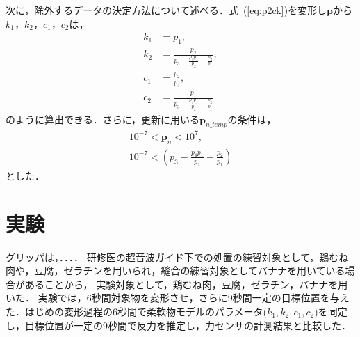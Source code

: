 \documentclass[a4paper]{jarticle}
\begin{document}
次に，除外するデータの決定方法について述べる．式~(\ref{eq:p2ck})を変形し$\mathbf{p}$から$k_1$，$k_2$，$c_1$，$c_2$は，
\begin{equation}
    \begin{aligned}
        k_1 &= p_1 ,\\
        k_2 &= \frac{p_2}{p_3 - \frac{p_4 p_1}{p_2} - \frac{p_2}{p_1}} ,\\
        c_1 &= \frac{p_2}{p_4},\\
        c_2 &= \frac{p_1}{p_3 - \frac{p_4 p_1}{p_2} - \frac{p_2}{p_1}} 
    \end{aligned}
\end{equation}
のように算出できる．さらに，更新に用いる$\mathbf{p}_{n\_temp}$の条件は，
\begin{equation}
    \begin{aligned}
        10^{-7} < \mathbf{p}_{n} < 10^{7} ,\\
        10^{-7} < \left( p_3 - \frac{p_4 p_1}{p_2} - \frac{p_2}{p_1} \right)
    \end{aligned}
\end{equation}
とした．

\section{実験}
グリッパは，．．．．
研修医の超音波ガイド下での処置の練習対象として，鶏むね肉や，豆腐，ゼラチンを用いられ，縫合の練習対象としてバナナを用いている場合があることから，
実験対象として，鶏むね肉，豆腐，ゼラチン，バナナを用いた．
実験では，6秒間対象物を変形させ，さらに9秒間一定の目標位置を与えた．はじめの変形過程の6秒間で柔軟物モデルのパラメータ($k_1, k_2, c_1, c_2$)を同定し，目標位置が一定の9秒間で反力を推定し，力センサの計測結果と比較した．
\end{document}
